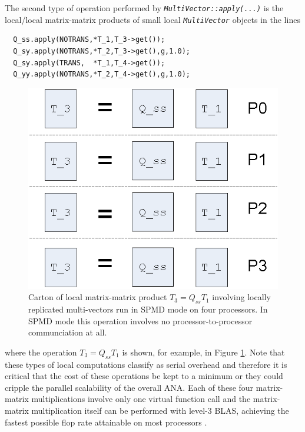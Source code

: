 The second type of operation performed by
{}\texttt{\textit{Multi\-Vector\-::apply(\-...)}} is the local/local
matrix-matrix products of small local
{}\texttt{\textit{Multi\-Vector}} objects in the lines

{\scriptsize\begin{verbatim}
  Q_ss.apply(NOTRANS,*T_1,T_3->get());
  Q_sy.apply(NOTRANS,*T_2,T_3->get(),g,1.0);
  Q_sy.apply(TRANS,  *T_1,T_4->get());
  Q_yy.apply(NOTRANS,*T_2,T_4->get(),g,1.0);
\end{verbatim}}

{\bsinglespace
\begin{figure}
\begin{center}
\includegraphics*[angle=0,scale=0.60]{SPMD_Local_Matrix_Matrix_Prod_P4}
\end{center}
\caption{
\label{tsfcore:fig:SPMD_Local_Matrix_Matrix_Prod_P4}
Carton of local matrix-matrix product $T_3 = Q_{ss} T_1$ involving
locally replicated multi-vectors run in SPMD mode on four processors.
In SPMD mode this operation involves no processor-to-processor
communciation at all.}
\end{figure}
\esinglespace}

{}\noindent{}where the operation $T_3 = Q_{ss} T_1$ is shown, for
example, in Figure
{}\ref{tsfcore:fig:SPMD_Local_Matrix_Matrix_Prod_P4}.  Note that these
types of local computations classify as serial overhead and therefore
it is critical that the cost of these operations be kept to a minimum
or they could cripple the parallel scalability of the overall ANA.
Each of these four matrix-matrix multiplications involve only one
virtual function call and the matrix-matrix multiplication itself can
be performed with level-3 BLAS, achieving the fastest possible flop
rate attainable on most processors {}\cite{ref:demmel_1997}.

